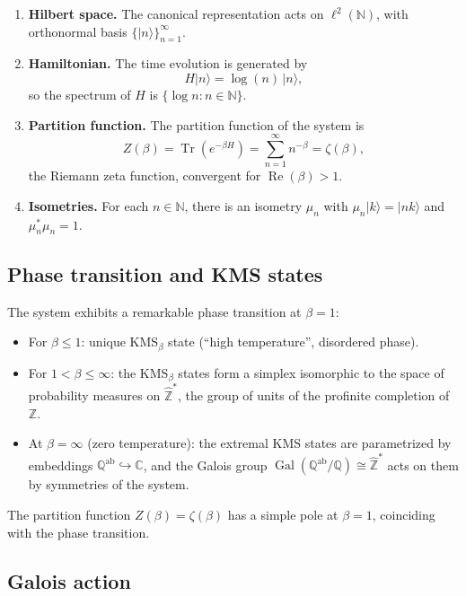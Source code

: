 \documentclass[12pt,a4paper]{article}
\newcommand{\Tr}{\operatorname{Tr}}
\newcommand{\Gal}{\operatorname{Gal}}
\newcommand{\Zhat}{\hat{\mathbb{Z}}}
\newcommand{\Qab}{\mathbb{Q}^{\mathrm{ab}}}
\begin{document}
\begin{enumerate}[label=(\roman*)]
\item \textbf{Hilbert space.} The canonical representation acts on $\ell^2(\mathbb{N})$, with orthonormal basis $\{|n\rangle\}_{n=1}^\infty$.
\item \textbf{Hamiltonian.} The time evolution is generated by
\begin{equation}\label{eq:BC-Hamiltonian}
  H|n\rangle = \log(n)\,|n\rangle,
\end{equation}
so the spectrum of $H$ is $\{\log n : n \in \mathbb{N}\}$.
\item \textbf{Partition function.} The partition function of the system is
\begin{equation}\label{eq:BC-partition}
  Z(\beta) = \Tr(e^{-\beta H}) = \sum_{n=1}^{\infty} n^{-\beta} = \zeta(\beta),
\end{equation}
the Riemann zeta function, convergent for $\operatorname{Re}(\beta) > 1$.
\item \textbf{Isometries.} For each $n \in \mathbb{N}$, there is an isometry $\mu_n$ with $\mu_n|k\rangle = |nk\rangle$ and $\mu_n^*\mu_n = 1$.
\end{enumerate}

\subsection{Phase transition and KMS states}

The system exhibits a remarkable phase transition at $\beta = 1$:

\begin{itemize}
\item For $\beta \leq 1$: unique KMS$_\beta$ state (``high temperature'', disordered phase).
\item For $1 < \beta \leq \infty$: the KMS$_\beta$ states form a simplex isomorphic to the space of probability measures on $\Zhat^*$, the group of units of the profinite completion of $\mathbb{Z}$.
\item At $\beta = \infty$ (zero temperature): the extremal KMS states are parametrized by embeddings $\Qab \hookrightarrow \mathbb{C}$, and the Galois group $\Gal(\Qab/\mathbb{Q}) \cong \Zhat^*$ acts on them by symmetries of the system.
\end{itemize}

The partition function $Z(\beta) = \zeta(\beta)$ has a simple pole at $\beta = 1$, coinciding with the phase transition.

\subsection{Galois action}
\end{document}
